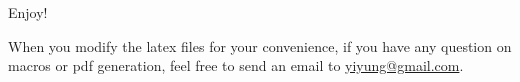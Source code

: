 \documentclass[handout,fleqn,aspectratio=169]{beamer}
\begin{document}














\begin{frame}{}
\vspace{2cm}
\LARGE Enjoy!

\bigskip
\large When you modify the latex files for your convenience, if you have any question on macros or pdf generation, feel free to send an email to \url{yiyung@gmail.com}.
\end{frame}


\end{document}

